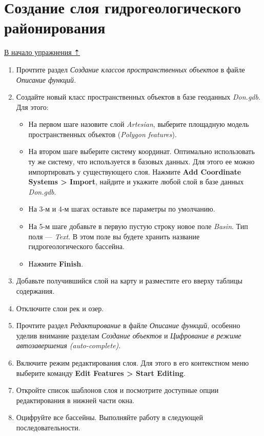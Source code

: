 \documentclass[]{book}
\theoremstyle{definition}
\theoremstyle{definition}
\theoremstyle{definition}
\theoremstyle{remark}
\begin{document}
\hypertarget{map-ref-hydrogeologic-regions}{%
\section{Создание слоя гидрогеологического
районирования}\label{map-ref-hydrogeologic-regions}}

\protect\hyperlink{map-ref-hydrogeologic}{В начало упражнения ⇡}

\begin{enumerate}
\def\labelenumi{\arabic{enumi}.}
\item
  Прочтите раздел \emph{Создание классов пространственных объектов} в
  файле \emph{Описание функций}.
\item
  Создайте новый класс пространственных объектов в базе геоданных
  \emph{Don.gdb}. Для этого:

  \begin{itemize}
  \item
    На первом шаге назовите слой \emph{Artesian}, выберите площадную
    модель пространственных объектов (\emph{Polygon features}).
  \item
    На втором шаге выберите систему координат. Оптимально использовать
    ту же систему, что используется в базовых данных. Для этого ее можно
    импортировать у существующего слоя. Нажмите \textbf{Add Coordinate
    Systems \textgreater{} Import}, найдите и укажите любой слой в базе
    данных \emph{Don.gdb}.
  \item
    На 3-м и 4-м шагах оставьте все параметры по умолчанию.
  \item
    На 5-м шаге добавьте в первую пустую строку новое поле \emph{Basin}.
    Тип поля --- \emph{Text}. В этом поле вы будете хранить название
    гидрогеологического бассейна.
  \item
    Нажмите \textbf{Finish}.
  \end{itemize}
\item
  Добавьте получившийся слой на карту и разместите его вверху таблицы
  содержания.
\item
  Отключите слои рек и озер.
\item
  Прочтите раздел \emph{Редактирование} в файле \emph{Описание функций},
  особенно уделив внимание разделам \emph{Создание объектов} и
  \emph{Цифрование в режиме автозавершения (auto-complete)}.
\item
  Включите режим редактирования слоя. Для этого в его контекстном меню
  выберите команду \textbf{Edit Features \textgreater{} Start Editing}.
\item
  Откройте список шаблонов слоя и посмотрите доступные опции
  редактирования в нижней части окна.
\item
  Оцифруйте все бассейны. Выполняйте работу в следующей
  последовательности.


\end{enumerate}
\end{document}
